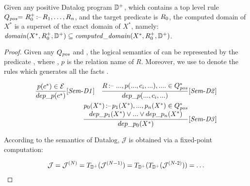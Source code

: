 \documentclass[acmsmall,screen,review,anonymous,nonacm]{acmart}
\begin{document}
\begin{lemma} 
\label{lemma:reasoning_over_approx}
Given any positive Datalog program $\mathbb{D}^+$, which contains a top level rule $\drule_{\m{pos}}{=}\ \relation_0^+{\datalogarrow}\relation_1,\dots,\relation_n$, and the target predicate is $R_0$, the computed domain of $X^*$ is a superset of the exact domain of $X^*$, namely: 
$\mathit{domain}(X^*, R_0^+, \mathbb{D}^+) \subseteq \mathit{computed\_domain}(X^*, R_0^+, \mathbb{D}^+)$. 
{
\small
\begin{proof}
Given any $Q_{\mathit{pos}}$ and \code{\SE}, the logical semantics of  can be represented by the 
predicate , where , \ie  $p$ is the relation name of $R$. 
Moreover, we use 
 to denote the rules which generates all the facts .  

{
\small
\begin{align*}
\frac{
p(c^*) \in \mathcal{E} 
}{
dep\_{p}(c^*)  
} \mathit{[Sem\text{-}D1]}
\quad 
\frac{
R \,\text{:--}\, \,..., p(..., c_i, ...), .... \in Q^{*}_{\mathit{pos}} 
}{
dep\_{p}(..., c_i,...) 
} \mathit{[Sem\text{-}D2]}
\\
\frac{
\begin{matrix}
{p_0}(X^*) \,\text{:--}\, {p_1}(X^*),..., {p_n}(X^*) \in Q^{*}_{\mathit{pos}} 
\\
dep\_{p_1}(X^*) \vee ... \vee dep\_{p_n}(X^*)
\end{matrix}
}{
dep\_{p_0}(X^*) 
} \mathit{[Sem\text{-}D3]}
\end{align*}}




According to the semantics of Datalog, $\mathcal{J}$ is obtained via a fixed-point computation:

\begin{align*}
   \mathcal{J} =  \mathcal{J}^{(N)} = T_{\mathbb{D}^+}(\mathcal{J}^{(N-1)}) = T_{\mathbb{D}^+}(T_{\mathbb{D}^+}(\mathcal{J}^{(N\text{-}2)})) = \dots
\end{align*}


\end{proof}}
\end{lemma}
\end{document}

